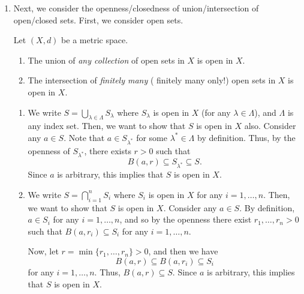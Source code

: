 \begin{enumerate}
\item Next, we consider the openness/closedness of union/intersection of
open/closed sets. First, we consider open sets.
\begin{proposition}
Let \((X,d)\) be a metric space.
\begin{enumerate}
\item \label{it:open-sets-union-open} The union of \emph{any collection} of open sets in \(X\) is open in \(X\).
\item \label{it:open-sets-intersect-open} The intersection of \emph{finitely
many} (\warn{} finitely many only!) open sets in \(X\) is open in \(X\).
\end{enumerate}
\end{proposition}
\begin{pf}
\begin{enumerate}
\item We write \(\displaystyle S=\bigcup_{\lambda\in\Lambda}S_{\lambda}\) where
\(S_{\lambda}\) is open in \(X\) (for any \(\lambda\in\Lambda\)), and
\(\Lambda\) is any index set. Then, we want to show that \(S\) is open in \(X\)
also. Consider any \(a\in S\). Note that \(a\in S_{\lambda^{*}}\) for some
\(\lambda^{*}\in\Lambda\) by definition. Thus, by the openness of \(S_{\lambda^{*}}\),
there exists \(r>0\) such that
\[
B(a,r)\subseteq S_{\lambda^{*}}\subseteq S.
\]
Since \(a\) is arbitrary, this implies that \(S\) is open in \(X\).

\item We write \(\displaystyle S=\bigcap_{i=1}^{n}S_i\) where \(S_{i}\) is open
in \(X\) for any \(i=1,\dotsc,n\). Then, we want to show that \(S\) is open in
\(X\).  Consider any \(a\in S\). By definition, \(a\in S_i\) for any
\(i=1,\dotsc,n\), and so by the openness there exist \(r_1,\dotsc,r_n>0\) such
that \(B(a,r_i)\subseteq S_i\) for any \(i=1,\dotsc,n\).

Now, let \(r=\min\{r_1,\dotsc,r_n\}>0\), and then we have
\[
B(a,r)\subseteq B(a,r_i)\subseteq S_i
\]
for any \(i=1,\dotsc,n\). Thus, \(B(a,r)\subseteq S\). Since \(a\) is
arbitrary, this implies that \(S\) is open in \(X\).
\end{enumerate}
\end{pf}


\end{enumerate}
